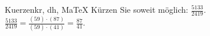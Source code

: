 \begin{MAufgabe}{Kuerzen}{kr, dh, MaTeX}
K\"urzen Sie soweit m\"oglich: $\frac{5133}{2419}$.\\ 
\ifLsg\MLoesung
\quad $\frac{5133}{2419}=\frac{(59)\cdot(87)}{(59)\cdot(41)}=\frac{87}{41}$.\else\relax\fi
 \end{MAufgabe}